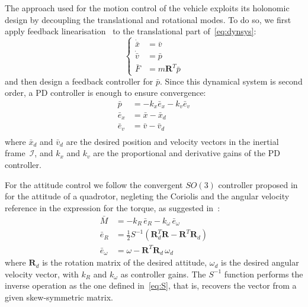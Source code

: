
The approach used for the motion control of the vehicle exploits its
holonomic design by
decoupling the translational and rotational modes. To do so, we first
apply feedback linearisation~\cite{sastry99} to the translational part
of~\eqref{eq:dynsys}:
\begin{equation}
  \label{eq:fctrl}
    \left\{
    \begin{split}
      \dot{\bar{x}} &= \bar{v} \\
      \dot{\bar{v}} &= \bar{p} \\
      \bar{F} &= m \mathbf{R}^T \bar{p}
    \end{split}
  \right.
\end{equation}
and then design a feedback controller for $\bar{p}$. Since this
dynamical system is second order, a PD controller is enough to ensure
convergence:
\begin{equation}
  \label{eq:pctrl}
  \begin{split}
    \bar{p} &= -k_x \bar{e}_x -k_v \bar{e}_v \\
    \bar{e}_x &= \bar{x} - \bar{x}_d \\
    \bar{e}_v &= \bar{v} - \bar{v}_d \\
  \end{split}
\end{equation}
where $\bar{x}_d$ and $\bar{v}_d$ are the desired position and
velocity vectors in the inertial frame~$\mathcal{I}$, and $k_x$ and
$k_v$ are the proportional and derivative gains of the PD controller.

For the attitude control we follow the convergent $SO(3)$ controller
proposed in~\cite{lee10} for the attitude of a quadrotor, negleting
the Coriolis and the angular velocity reference in the expression for
the torque, as suggested in~\cite{mahony12}:
\begin{equation}
  \label{eq:mctrl}
  \begin{split}
    \bar{M} &= -k_R\,\bar{e}_R - k_\omega\,\bar{e}_\omega \\
    \bar{e}_R &= \frac{1}{2} S^{-1}( \mathbf{R}^T_d \mathbf{R} -
    \mathbf{R}^T \mathbf{R}_d ) \\
    \bar{e}_\omega &= \omega - \mathbf{R}^T \mathbf{R}_d\,\omega_d
  \end{split}
\end{equation}
where $\mathbf{R}_d$ is the rotation matrix of the desired attitude,
$\omega_d$ is the desired angular velocity vector, with $k_R$ and
$k_\omega$ as controller gains. The $S^{-1}$ function performs the inverse
operation as the one defined in~\eqref{eq:S}, that is, recovers
the vector from a given skew-symmetric matrix.


